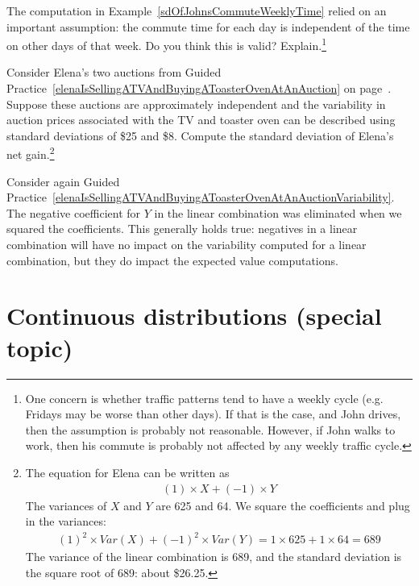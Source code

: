 \begin{exercise}
The computation in Example~\ref{sdOfJohnsCommuteWeeklyTime} relied on an important assumption: the commute time for each day is independent of the time on other days of that week. Do you think this is valid? Explain.\footnote{One concern is whether traffic patterns tend to have a weekly cycle (e.g. Fridays may be worse than other days). If that is the case, and John drives, then the assumption is probably not reasonable. However, if John walks to work, then his commute is probably not affected by any weekly traffic cycle.}
\end{exercise}

\begin{exercise}\label{elenaIsSellingATVAndBuyingAToasterOvenAtAnAuctionVariability}
Consider Elena's two auctions from Guided Practice~\ref{elenaIsSellingATVAndBuyingAToasterOvenAtAnAuction} on page~\pageref{elenaIsSellingATVAndBuyingAToasterOvenAtAnAuction}. Suppose these auctions are approximately independent and the variability in auction prices associated with the TV and toaster oven can be described using standard deviations of \$25 and \$8. Compute the standard deviation of Elena's net gain.\footnote{The equation for Elena can be written as
\begin{align*}
(1)\times X + (-1)\times Y
\end{align*}
The variances of $X$ and $Y$ are 625 and 64. We square the coefficients and plug in the variances:
\begin{align*}
(1)^2\times Var(X) + (-1)^2\times Var(Y) = 1\times 625 + 1\times 64 = 689
\end{align*}
The variance of the linear combination is 689, and the standard deviation is the square root of 689: about \$26.25.}
\end{exercise}

Consider again Guided Practice~\ref{elenaIsSellingATVAndBuyingAToasterOvenAtAnAuctionVariability}. The negative coefficient for $Y$ in the linear combination was eliminated when we squared the coefficients. This generally holds true: negatives in a linear combination will have no impact on the variability computed for a linear combination, but they do impact the expected value computations.


\section{Continuous distributions (special topic)}
\label{contDist}

